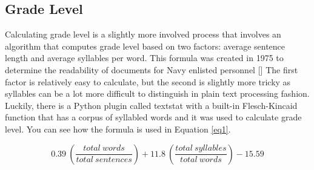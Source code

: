 \subsection{Grade Level}
Calculating grade level is a slightly more involved process that involves an algorithm that computes grade level based on two factors: average sentence length and average syllables per word.
This formula was created in 1975 to determine the readability of documents for Navy enlisted personnel [\cite{kincaid1975derivation}]
The first factor is relatively easy to calculate, but the second is slightly more tricky as syllables can be a lot more difficult to distinguish in plain text processing fashion.
Luckily, there is a Python plugin called textstat with a built-in Flesch-Kincaid function that has a corpus of syllabled words and it was used to calculate grade level.
You can see how the formula is used in Equation \ref{eq1}.

\begin{equation} \label{eq1}
    0.39\ (\frac{total\ words}{total\ sentences}) + 11.8\ (\frac{total\ syllables}{total\ words}) - 15.59
\end{equation}

